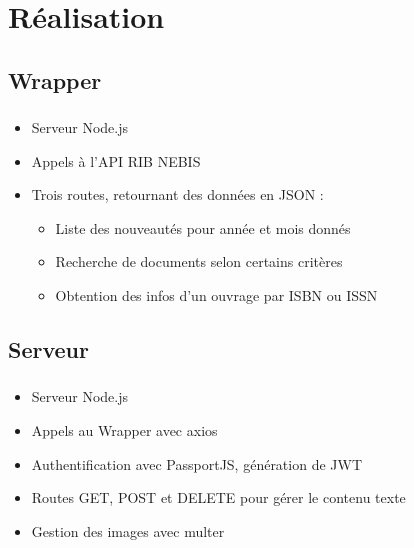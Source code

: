 \documentclass[10pt]{beamer}
\begin{document}
\section{Réalisation}
\subsection{Wrapper}
\begin{frame}
	\frametitle{\secname}
	\framesubtitle{\subsecname}
	\begin{itemize}
        \item Serveur Node.js
        \item Appels à l'API RIB NEBIS
        \item Trois routes, retournant des données en JSON :
        \begin{itemize}
            \item Liste des nouveautés pour année et mois donnés
            \item Recherche de documents selon certains critères
            \item Obtention des infos d'un ouvrage par ISBN ou ISSN
        \end{itemize}
    \end{itemize}
\end{frame}

\subsection{Serveur}
\begin{frame}
	\frametitle{\secname}
	\framesubtitle{\subsecname}
	\begin{itemize}
        \item Serveur Node.js
        \item Appels au Wrapper avec axios
        \item Authentification avec PassportJS, génération de JWT
        \item Routes GET, POST et DELETE pour gérer le contenu texte
        \item Gestion des images avec multer
    \end{itemize}
\end{frame}
\end{document}
